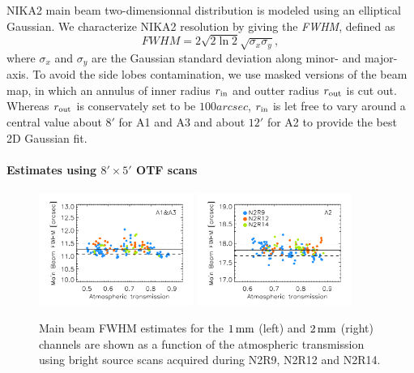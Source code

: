 NIKA2 main beam two-dimensionnal distribution is modeled using an elliptical Gaussian. We characterize NIKA2 resolution by giving the \emph{FWHM}, defined as
\begin{equation}
  FWHM = 2 \sqrt{2\ln {2}} \sqrt{\sigma_x\sigma_y},
\end{equation}
where $\sigma_x$ and $\sigma_y$ are the Gaussian standard deviation along minor- and major-axis. To avoid the side lobes contamination, we use masked versions of the beam map, in which an annulus of inner radius $r_{\rm{in}}$ and outter radius $r_{\rm{out}}$ is cut out. Whereas $r_{\rm{out}}$ is conservately set to be $100 arcsec$, $r_{\rm{in}}$ is let free to vary around a central value about $8'$ for A1 and A3 and about $12'$ for A2 to provide the best 2D Gaussian fit.  

\paragraph{Estimates using $8' \times 5'$ OTF scans}

\begin{figure}[ht!]
\begin{center}
  \includegraphics[clip, width=0.45\textwidth]{Figures/Beams/plot_FWHM_vs_atmtrans_mb_radius_binning2_1mm.pdf}
  \includegraphics[clip, width=0.45\textwidth]{Figures/Beams/plot_FWHM_vs_atmtrans_mb_radius_binning2_a2.pdf}
  \caption[Main Beam FWHM]{Main beam FWHM estimates for the $1\,\rm{mm}$ (left) and $2\,\rm{mm}$ (right) channels are shown as a function of the atmospheric transmission using bright source scans acquired during N2R9, N2R12 and N2R14. }
\label{fig:fwhm_map_atmtrans}
\end{center}
\end{figure}

